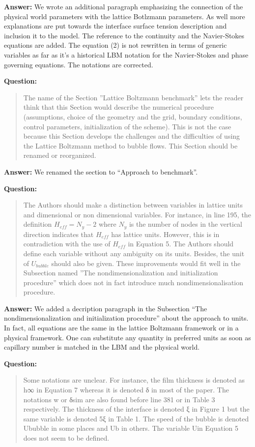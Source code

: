 \documentclass{article}
\begin{document}
\textbf{Answer:} We wrote an additional paragraph emphasizing the connection of the physical world
parameters with the lattice Botlzmann parameters. As well more explanations are put towards the
interface surface tension description and inclusion it to the model. The reference to the
continuity and the Navier-Stokes equations are added. The equation (2) is not rewritten in terms of
generic variables as far as it's a historical LBM notation for the Navier-Stokes and phase
governing equations. The notations are corrected.

\textbf{Question:}
\begin{quotation}
The name of the Section ”Lattice Boltzmann benchmark” lets the reader think that this Section
would describe the numerical procedure (assumptions, choice of the geometry and the grid, boundary
conditions, control parameters, initialization of the scheme). This is not the case because this
Section
develops the challenges and the difficulties of using the Lattice Boltzmann method to bubble ﬂows.
This Section should be renamed or reorganized.
\end{quotation}

\textbf{Answer:} We renamed the section to ``Approach to benchmark''.

\textbf{Question:}
\begin{quotation}
The Authors should make a distinction between variables in lattice units and dimensional or non
dimensional variables. For instance, in line 195, the definition $H_{eff} = N_y − 2$ where $N_y$ is
the
number of nodes in the vertical direction indicates that $H_{eff}$ has lattice units. However, this
is in
contradiction with the use of $H_{eff}$ in Equation 5. The Authors should deﬁne each variable
without
any ambiguity on its units. Besides, the unit of $U_{bubble}$ should also be given. These
improvements
would ﬁt well in the Subsection named ”The nondimensionalization and initialization procedure”
which does not in fact introduce much nondimensionalisation procedure.
\end{quotation}

\textbf{Answer:} We added a decription paragraph in the Subsection ``The nondimensionalization and
initialization procedure'' about the approach to units. In fact, all equations are the same in the
lattice Boltzmann framework or in a physical framework. One can substitute any quantity in
preferred units as soon as capillary number is matched in the LBM and the physical world. 

\textbf{Question:}
\begin{quotation}
Some notations are unclear. For instance, the ﬁlm thickness is denoted as h∞ in Equation 7 whereas
it is denoted δ in most of the paper. The notations w or δsim are also found before line 381 or in
Table 3 respectively. The thickness of the interface is denoted ξ in Figure 1 but the same variable
is
denoted 5ξ in Table 1. The speed of the bubble is denoted Ububble in some places and Ub in others.
The variable Uin Equation 5 does not seem to be deﬁned.
\end{quotation}
\end{document}
